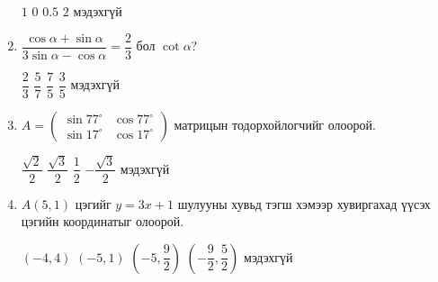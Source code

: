\documentclass{exam}
\begin{document}
\begin{enumerate}
    \begin{oneparchoices}
            \choice $1$
            \choice $0$
            \choice $0.5$
            \choice $2$
            \choice мэдэхгүй
        \end{oneparchoices} 
    \item 
    $\dfrac{\cos\alpha+\sin\alpha}{3\sin\alpha-\cos\alpha}=\dfrac{2}{3}$ бол $\cot\alpha$?
    \begin{oneparchoices}
            \choice $\dfrac{2}{3}$
            \choice $\dfrac{5}{7}$
            \choice $\dfrac{7}{5}$
            \choice $\dfrac{3}{5}$
            \choice мэдэхгүй
        \end{oneparchoices} 
    \item $A=\begin{pmatrix}
    \sin77^\circ & \cos77^\circ\\
    \sin17^\circ & \cos17^\circ
    \end{pmatrix}$ матрицын тодорхойлогчийг олоорой. 
    
        \begin{oneparchoices}
            \choice $\dfrac{\sqrt{2}}{2}$
            \choice $\dfrac{\sqrt{3}}{2}$
            \choice $\dfrac{1}{2}$
            \choice $-\dfrac{\sqrt{3}}{2}$
            \choice мэдэхгүй
        \end{oneparchoices}
    \item $A(5,1)$ цэгийг $y=3x+1$ шулууны хувьд тэгш хэмээр хувиргахад үүсэх цэгийн координатыг олоорой.
    
        \begin{oneparchoices}
            \choice $(-4, 4)$
            \choice $(-5, 1)$
            \choice $\left(-5, \dfrac{9}{2}\right)$
            \choice $\left(-\dfrac{9}{2}, \dfrac{5}{2}\right)$
            \choice мэдэхгүй
        \end{oneparchoices}
\end{enumerate}
\end{document}
